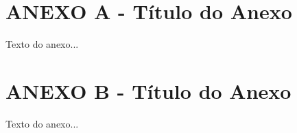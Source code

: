 
\chapter{ANEXO A - Título do Anexo}
\label{anexo:a}

Texto do anexo...

\chapter{ANEXO B - Título do Anexo}
\label{anexo:b}

Texto do anexo...

